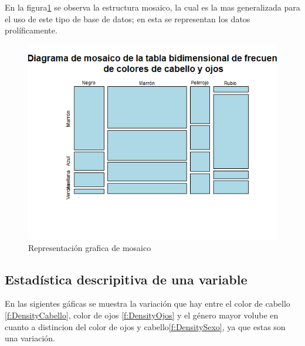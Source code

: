 \documentclass[12pt,a4paper]{article}
\begin{document}
En la figura\ref{fig:Mosaico} se observa la estructura mosaico, la cual es la mas generalizada para el uso de este tipo de base de datos; en esta se representan los datos prolíficamente\citep{CodigoRPubs}.

\begin{figure}[h]
\centering
\includegraphics[scale=0.7]{Mosaico}
\caption{Representación grafica de mosaico}
\label{fig:Mosaico}
\end{figure}

\newpage


\subsection{Estadística descripitiva de una variable}

En las sigientes gáficas se muestra la variación que hay entre el color de cabello \ref{f:DensityCabello}, color de ojos   \ref{f:DensityOjos} y el género mayor volube en cuanto a distincion del color de ojos y cabello\ref{f:DensitySexo}, ya que estas son una variación. 
\end{document}
